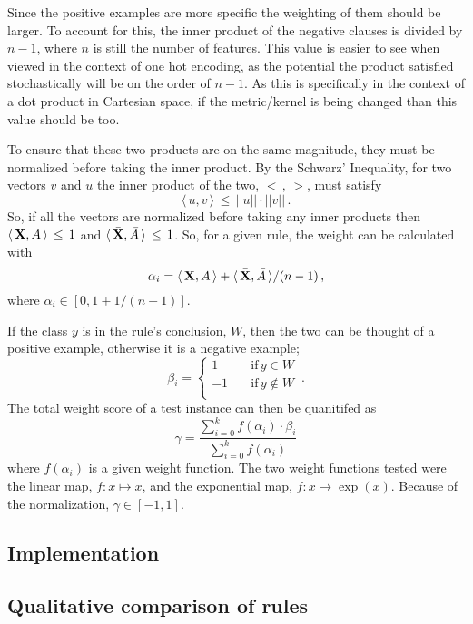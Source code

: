 \documentclass[10pt]{article}
\begin{document}
Since the positive examples are more specific the weighting of them should be larger. To account for this, the inner product of the negative clauses is divided by $n-1$, where $n$ is still the number of features. This value is easier to see when viewed in the context of one hot encoding, as the potential the product satisfied stochastically will be on the order of $n-1$. As this is specifically in the context of a dot product in Cartesian space, if the metric/kernel is being changed than this value should be too. 

To ensure that these two products are on the same magnitude, they must be normalized before taking the inner product. By the Schwarz' Inequality, for two vectors $v$ and $u$ the inner product of the two, $< \, , \, >$, must satisfy 
\[\langle \,u, v \, \rangle \, \leq \,  ||u|| \cdot ||v|| \, .\]
So, if all the vectors are normalized before taking any inner products then $\langle \,\vb{X}, A \, \rangle \,\leq\, 1$ and $\langle \, \bar{\vb{X}}, \bar{A} \, \rangle \, \leq \, 1$. So, for a given rule, the weight can be calculated with 
\[\alpha_i = \langle \,\vb{X}, A \, \rangle + \langle \, \bar{\vb{X}}, \bar{A} \, \rangle / (n-1) \, ,\]
where $\alpha_i \in [0, 1+ 1/(n-1)]$.

If the class $y$ is in the rule's conclusion, $W$, then the two can be thought of a positive example, otherwise it is a negative example;
\begin{equation*}
\beta_i=\begin{cases}
          1 \quad &\text{if} \, y \in W \\
          -1 \quad &\text{if} \, y \notin W\\
     \end{cases} \, .
\end{equation*}
The total weight score of a test instance can then be quanitifed as 
\begin{equation}
\gamma = \frac{\sum_{i=0}^k f(\alpha_i) \cdot \beta_i}{\sum_{i=0}^k f(\alpha_i)}
\end{equation}
where $f(\alpha_i)$ is a given weight function. The two weight functions tested were the linear map, $f: x\mapsto x$, and the exponential map, $f: x\mapsto \exp(x)$. Because of the normalization, $\gamma \in [-1, 1]$.


\subsection{Implementation}
\subsection{Qualitative comparison of rules}
\end{document}
